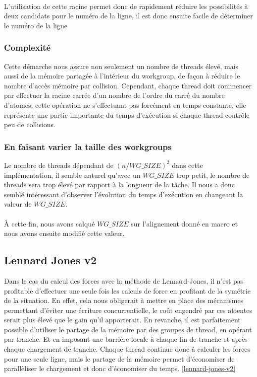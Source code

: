 \documentclass{article}
\begin{document}
\paragraph{}
L'utilisation de cette racine permet donc de rapidement réduire les possibilités
à deux candidats pour le numéro de la ligne, il est donc ensuite facile de
déterminer le numéro de la ligne

\subsubsection{Complexité}
Cette démarche nous assure non seulement un nombre de threads élevé, mais aussi
de la mémoire partagée à l'intérieur du workgroup, de façon à réduire le nombre
d'accès mémoire par collision. Cependant, chaque thread doit commencer par
effectuer la racine carrée d'un nombre de l'ordre du carré du nombre d'atomes,
cette opération ne s'effectuant pas forcément en temps constante, elle
représente une partie importante du temps d'exécution si chaque thread contrôle
peu de collisions.
\subsubsection{En faisant varier la taille des workgroups}
Le nombre de threads dépendant de $(n/ WG\_SIZE)^2$ dans cette implémentation,
il semble naturel qu'avec un $WG\_SIZE$ trop petit, le nombre de threads sera
trop élevé par rapport à la longueur de la tâche. Il nous a donc semblé
intéressant d'observer l'évolution du temps d'exécution en changeant la valeur
de $WG\_SIZE$.
\paragraph{}
À cette fin, nous avons calqué $WG\_SIZE$ sur l'alignement donné en macro et
nous avons ensuite modifié cette valeur.

\subsection{Lennard Jones v2}
Dans le cas du calcul des forces avec la méthode de Lennard-Jones, il n'est pas
profitable d'effectuer une seule fois les calculs de force en profitant de la
symétrie de la situation. En effet, cela nous obligerait à mettre en place des
mécanismes permettant d'éviter une écriture concurrentielle, le coût engendré
par ces attentes serait plus élevé que le gain qu'il apporterait.
En revanche, il est parfaitement possible d'utiliser le partage de la mémoire
par des groupes de thread, en opérant par tranche. Et en imposant une barrière
locale à chaque fin de tranche et après chaque chargement de tranche.
Chaque thread continue donc à calculer les forces pour une seule ligne, mais le
partage de la mémoire permet d'économiser de parallèliser le chargement et donc
d'économiser du temps. \ref{lennard-jones-v2}
\end{document}
